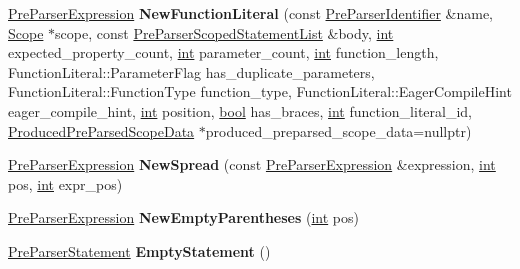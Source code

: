 \begin{DoxyCompactItemize}
\mbox{\hyperlink{classv8_1_1internal_1_1PreParserExpression}{Pre\+Parser\+Expression}} {\bfseries New\+Function\+Literal} (const \mbox{\hyperlink{classv8_1_1internal_1_1PreParserIdentifier}{Pre\+Parser\+Identifier}} \&name, \mbox{\hyperlink{classv8_1_1internal_1_1Scope}{Scope}} $\ast$scope, const \mbox{\hyperlink{classv8_1_1internal_1_1PreParserScopedStatementList}{Pre\+Parser\+Scoped\+Statement\+List}} \&body, \mbox{\hyperlink{classint}{int}} expected\+\_\+property\+\_\+count, \mbox{\hyperlink{classint}{int}} parameter\+\_\+count, \mbox{\hyperlink{classint}{int}} function\+\_\+length, Function\+Literal\+::\+Parameter\+Flag has\+\_\+duplicate\+\_\+parameters, Function\+Literal\+::\+Function\+Type function\+\_\+type, Function\+Literal\+::\+Eager\+Compile\+Hint eager\+\_\+compile\+\_\+hint, \mbox{\hyperlink{classint}{int}} position, \mbox{\hyperlink{classbool}{bool}} has\+\_\+braces, \mbox{\hyperlink{classint}{int}} function\+\_\+literal\+\_\+id, \mbox{\hyperlink{classv8_1_1internal_1_1ProducedPreParsedScopeData}{Produced\+Pre\+Parsed\+Scope\+Data}} $\ast$produced\+\_\+preparsed\+\_\+scope\+\_\+data=nullptr)
\item 
\mbox{\label{classv8_1_1internal_1_1PreParserFactory_a2ae5399bdd9ca16f780f09773666e87e}} 
\mbox{\hyperlink{classv8_1_1internal_1_1PreParserExpression}{Pre\+Parser\+Expression}} {\bfseries New\+Spread} (const \mbox{\hyperlink{classv8_1_1internal_1_1PreParserExpression}{Pre\+Parser\+Expression}} \&expression, \mbox{\hyperlink{classint}{int}} pos, \mbox{\hyperlink{classint}{int}} expr\+\_\+pos)
\item 
\mbox{\label{classv8_1_1internal_1_1PreParserFactory_a788cba89e0ed058cf76b8d68f46e255d}} 
\mbox{\hyperlink{classv8_1_1internal_1_1PreParserExpression}{Pre\+Parser\+Expression}} {\bfseries New\+Empty\+Parentheses} (\mbox{\hyperlink{classint}{int}} pos)
\item 
\mbox{\label{classv8_1_1internal_1_1PreParserFactory_acf87ca012461e97ac4711dc8fd801e11}} 
\mbox{\hyperlink{classv8_1_1internal_1_1PreParserStatement}{Pre\+Parser\+Statement}} {\bfseries Empty\+Statement} ()
\item 
\mbox{\label{classv8_1_1internal_1_1PreParserFactory_a158e969ff61faf01676d443e8897c556}} 

\end{DoxyCompactItemize}
